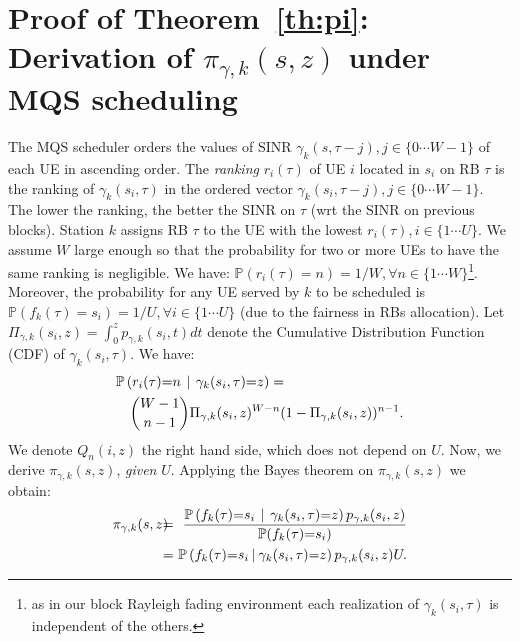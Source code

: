 \documentclass[draftcls,onecolumn]{IEEEtran}
\theoremstyle{plain}
\theoremstyle{definition}
\begin{document}
\section{Proof of Theorem~\ref{th:pi}: Derivation of $\pi_{\gamma,k}(s,z)$ under MQS scheduling} \label{appendix:MQS}
The MQS scheduler orders the values of SINR $\gamma_k(s,\tau-j),j \in \{0\cdots W-1\}$ of each UE in ascending order. 
The {\it ranking} $r_i(\tau)$ of UE $i$ located in $s_i$ on RB $\tau$ is the ranking of $\gamma_k(s_i,\tau)$ in the ordered vector $\gamma_k(s_i,\tau-j),j\in \{ 0\cdots W-1 \}$. The lower the ranking, the better the SINR on $\tau$ (wrt the SINR on previous blocks). 
Station $k$ assigns RB $\tau$ to the UE with the lowest $r_i(\tau), i \in \{1 \cdots U\}$. We assume $W$ large enough so that the probability for two or more UEs to have the same ranking is negligible.  
We have: $\mathbb{{P}}(r_{i}(\tau){=}n){=}1/W, \forall n \in\{1\cdots W\}$\footnote{as in our block Rayleigh fading environment each realization of $\gamma_k(s_i,\tau)$ is independent of the others.}. 
Moreover, the probability for any UE served by $k$ to be scheduled is $\mathbb{{P}}(f_k(\tau){=}s_i)=1/U,\forall i \in\{1 \cdots U\}$ (due to the fairness in RBs allocation). 
Let $\Pi_{\gamma,k}(s_i,z)=\int_{0}^{z}p_{\gamma,k}(s_i,t){dt}$ denote the Cumulative Distribution Function (CDF) of $\gamma_k(s_i,\tau)$. We have: 
\begin{eqnarray}
\lefteqn{\mathbb{{P}}\left(r_i(\tau){=}n \hspace{4pt} \middle | \hspace{4 pt} \gamma_{k}(s_i,\tau){=}z \right)=} \notag \\
&& \binom{W-1}{n-1}\Pi_{\gamma,k}(s_i,z)^{W-n}(1-\Pi_{\gamma,k}(s_i,z))^{n-1}. 
\end{eqnarray}
We denote $Q_n(i,z)$ the right hand side, which does not depend on $U$. Now, we derive $\pi_{\gamma,k}(s,z)$, {\it given} $U$. Applying the Bayes theorem on $\pi_{\gamma,k}(s,z)$ we obtain:
\begin{eqnarray}
    \pi_{\gamma,k}(s,z)\!\!\!\!&=& \!\!\!\! \frac{ \mathbb{{P}}\left( f_k(\tau){=}s_i \hspace{4pt} \middle | \hspace{4 pt} \gamma_k(s_i,\tau) {=}z \right)  p_{\gamma,k}(s_i,z)  }{\mathbb{{P}}(f_k(\tau){=}s_i)} \notag \\
     \!\!\!\!&=& \!\!\!\!\mathbb{{P}}\left( f_k(\tau){=}s_i \hspace{2pt} \middle | \hspace{2 pt} \gamma_k(s_i,\tau) {=}z \right) p_{\gamma,k}(s_i,z) U. \label{eq:bigeq2}
\end{eqnarray}
\end{document}
